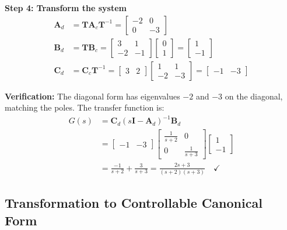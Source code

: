 \begin{example}
\textbf{Step 4: Transform the system}
\begin{align}
\mathbf{A}_d &= \mathbf{T}\mathbf{A}_c\mathbf{T}^{-1} = \begin{bmatrix} -2 & 0 \\ 0 & -3 \end{bmatrix} \\
\mathbf{B}_d &= \mathbf{T}\mathbf{B}_c = \begin{bmatrix} 3 & 1 \\ -2 & -1 \end{bmatrix}\begin{bmatrix} 0 \\ 1 \end{bmatrix} = \begin{bmatrix} 1 \\ -1 \end{bmatrix} \\
\mathbf{C}_d &= \mathbf{C}_c\mathbf{T}^{-1} = \begin{bmatrix} 3 & 2 \end{bmatrix}\begin{bmatrix} 1 & 1 \\ -2 & -3 \end{bmatrix} = \begin{bmatrix} -1 & -3 \end{bmatrix}
\end{align}

\textbf{Verification:} The diagonal form has eigenvalues $-2$ and $-3$ on the diagonal, matching the poles. The transfer function is:
\begin{align}
G(s) &= \mathbf{C}_d(s\mathbf{I} - \mathbf{A}_d)^{-1}\mathbf{B}_d \\
&= \begin{bmatrix} -1 & -3 \end{bmatrix}\begin{bmatrix} \frac{1}{s+2} & 0 \\ 0 & \frac{1}{s+3} \end{bmatrix}\begin{bmatrix} 1 \\ -1 \end{bmatrix} \\
&= \frac{-1}{s+2} + \frac{3}{s+3} = \frac{2s+3}{(s+2)(s+3)} \quad \checkmark
\end{align}
\end{example}

\subsection{Transformation to Controllable Canonical Form}

